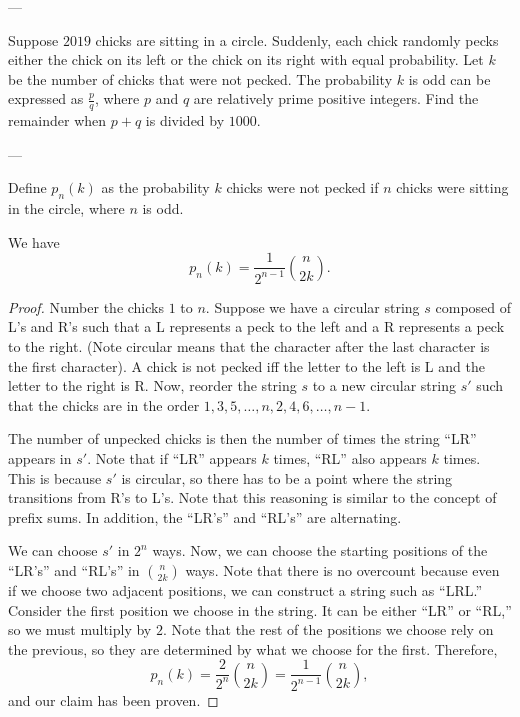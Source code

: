 
---

Suppose $2019$ chicks are sitting in a circle. Suddenly, each chick randomly pecks either the chick on its left or the chick on its right with equal probability. Let $k$ be the number of chicks that were not pecked. The probability $k$ is odd can be expressed as $\frac{p}{q}$, where $p$ and $q$ are relatively prime positive integers. Find the remainder when $p+q$ is divided by $1000$. 

---

Define $p_n(k)$ as the probability $k$ chicks were not pecked if $n$ chicks were sitting in the circle, where $n$ is odd.
\begin{iclaim}
    We have \[p_n(k)=\frac{1}{2^{n-1}}\binom{n}{2k}.\]
\end{iclaim}
\begin{proof}
    Number the chicks $1$ to $n$. Suppose we have a circular string $s$ composed of L's and R's such that a L represents a peck to the left and a R represents a peck to the right. (Note circular means that the character after the last character is the first character). A chick is not pecked iff the letter to the left is L and the letter to the right is R. Now, reorder the string $s$ to a new circular string $s'$ such that the chicks are in the order $1,3,5,\ldots,n,2,4,6,\ldots,n-1$. 

    The number of unpecked chicks is then the number of times the string \enquote{LR} appears in $s'$. Note that if \enquote{LR} appears $k$ times, \enquote{RL} also appears $k$ times. This is because $s'$ is circular, so there has to be a point where the string transitions from R's to L's. Note that this reasoning is similar to the concept of prefix sums. In addition, the \enquote{LR's} and \enquote{RL's} are alternating.

    We can choose $s'$ in $2^n$ ways. Now, we can choose the starting positions of the \enquote{LR's} and \enquote{RL's} in $\binom{n}{2k}$ ways. Note that there is no overcount because even if we choose two adjacent positions, we can construct a string such as \enquote{LRL.} Consider the first position we choose in the string. It can be either \enquote{LR} or \enquote{RL,} so we must multiply by $2$. Note that the rest of the positions we choose rely on the previous, so they are determined by what we choose for the first. Therefore, \[p_n(k)=\frac{2}{2^n}\binom{n}{2k}=\frac{1}{2^{n-1}}\binom{n}{2k},\]
    and our claim has been proven.
\end{proof}

